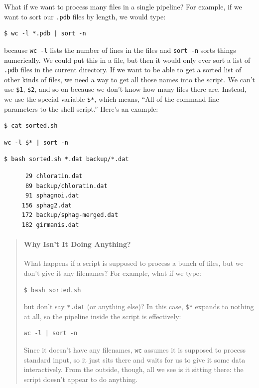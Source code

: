 \documentclass[]{book}
\begin{document}
What if we want to process many files in a single pipeline? For example,
if we want to sort our \texttt{.pdb} files by length, we would type:

\begin{verbatim}
$ wc -l *.pdb | sort -n
\end{verbatim}

because \texttt{wc -l} lists the number of lines in the files and
\texttt{sort -n} sorts things numerically. We could put this in a file,
but then it would only ever sort a list of \texttt{.pdb} files in the
current directory. If we want to be able to get a sorted list of other
kinds of files, we need a way to get all those names into the script. We
can't use \texttt{\$1}, \texttt{\$2}, and so on because we don't know
how many files there are. Instead, we use the special variable
\texttt{\$*}, which means, ``All of the command-line parameters to the
shell script.'' Here's an example:

\begin{verbatim}
$ cat sorted.sh
\end{verbatim}

\begin{verbatim}
wc -l $* | sort -n
\end{verbatim}

\begin{verbatim}
$ bash sorted.sh *.dat backup/*.dat
\end{verbatim}

\begin{verbatim}
      29 chloratin.dat
      89 backup/chloratin.dat
      91 sphagnoi.dat
     156 sphag2.dat
     172 backup/sphag-merged.dat
     182 girmanis.dat
\end{verbatim}

\begin{quote}
\mbox{}\paragraph{Why Isn't It Doing Anything?}

What happens if a script is supposed to process a bunch of files, but we
don't give it any filenames? For example, what if we type:

\begin{verbatim}
$ bash sorted.sh
\end{verbatim}

but don't say \texttt{*.dat} (or anything else)? In this case,
\texttt{\$*} expands to nothing at all, so the pipeline inside the
script is effectively:

\begin{verbatim}
wc -l | sort -n
\end{verbatim}

Since it doesn't have any filenames, \texttt{wc} assumes it is supposed
to process standard input, so it just sits there and waits for us to
give it some data interactively. From the outside, though, all we see is
it sitting there: the script doesn't appear to do anything.
\end{quote}
\end{document}

